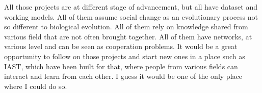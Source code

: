 \documentclass[10pt]{article}
\begin{document}
All those projects are at different stage of advancement, but all have dataset and working models. All of them assume social change as an evolutionary process not so different to biological evolution. All of them rely on knowledge shared from various field that are not often brought together. All of them have networks, at various level and can be seen as cooperation problems.  It would be a great opportunity to follow on those projects and start new ones in a place such as IAST, which have been built for that,  where people from various fields can interact and learn from each other. I guess it would be one of the only place where I could do so.




                   
\end{document}
